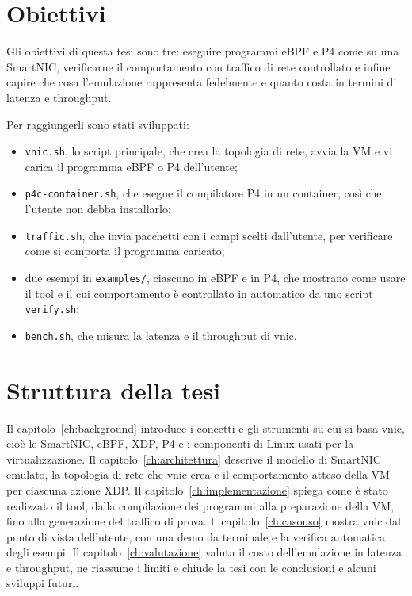 \section{Obiettivi}\label{sec:obiettivi}

Gli obiettivi di questa tesi sono tre: eseguire programmi eBPF e P4 come su una SmartNIC, verificarne il comportamento con traffico di rete controllato e infine capire che cosa l'emulazione rappresenta fedelmente e quanto costa in termini di latenza e throughput.

Per raggiungerli sono stati sviluppati:
\begin{itemize}
    \item \texttt{vnic.sh}, lo script principale, che crea la topologia di rete, avvia la VM e vi carica il programma eBPF o P4 dell'utente;
    \item \texttt{p4c-container.sh}, che esegue il compilatore P4 in un container, così che l'utente non debba installarlo;
    \item \texttt{traffic.sh}, che invia pacchetti con i campi scelti dall'utente, per verificare come si comporta il programma caricato;
    \item due esempi in \texttt{examples/}, ciascuno in eBPF e in P4, che mostrano come usare il tool e il cui comportamento è controllato in automatico da uno script \texttt{verify.sh};
    \item \texttt{bench.sh}, che misura la latenza e il throughput di vnic.
\end{itemize}

\section{Struttura della tesi}\label{sec:struttura}

Il capitolo~\ref{ch:background} introduce i concetti e gli strumenti su cui si basa vnic, cioè le SmartNIC, eBPF, XDP, P4 e i componenti di Linux usati per la virtualizzazione. Il capitolo~\ref{ch:architettura} descrive il modello di SmartNIC emulato, la topologia di rete che vnic crea e il comportamento atteso della VM per ciascuna azione XDP. Il capitolo~\ref{ch:implementazione} spiega come è stato realizzato il tool, dalla compilazione dei programmi alla preparazione della VM, fino alla generazione del traffico di prova. Il capitolo~\ref{ch:casouso} mostra vnic dal punto di vista dell'utente, con una demo da terminale e la verifica automatica degli esempi. Il capitolo~\ref{ch:valutazione} valuta il costo dell'emulazione in latenza e throughput, ne riassume i limiti e chiude la tesi con le conclusioni e alcuni sviluppi futuri.
